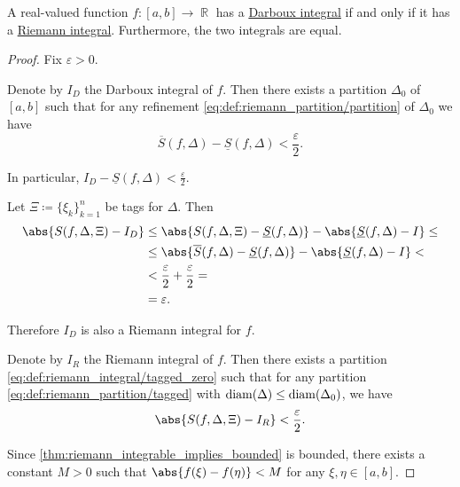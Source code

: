 \begin{proposition}\label{thm:darboux_integral_iff_riemann_integral}
  A real-valued function \( f: [a, b] \to \BbbR \) has a \hyperref[def:darboux_integral]{Darboux integral} if and only if it has a \hyperref[def:riemann_integral]{Riemann integral}. Furthermore, the two integrals are equal.
\end{proposition}
\begin{proof}
  Fix \( \varepsilon > 0 \).

   Denote by \( I_D \) the Darboux integral of \( f \). Then there exists a partition \( \Delta_0 \) of \( [a, b] \) such that for any refinement \eqref{eq:def:riemann_partition/partition} of \( \Delta_0 \) we have
  \begin{equation*}
    \overline{S}(f, \Delta) - \underline{S}(f, \Delta) < \frac \varepsilon 2.
  \end{equation*}

  In particular, \( I_D - \underline{S}(f, \Delta) < \tfrac \varepsilon 2 \).

  Let \( \Xi \coloneqq \{ \xi_k \}_{k=1}^n \) be tags for \( \Delta \). Then
  \begin{align*}
    \abs{S(f, \Delta, \Xi) - I_D}
    &\leq
    \abs{S(f, \Delta, \Xi) - \underline{S}(f, \Delta)} - \abs{\underline{S}(f, \Delta) - I}
    \leq \\ &\leq
    \abs{\overline{S}(f, \Delta) - \underline{S}(f, \Delta)} - \abs{\underline{S}(f, \Delta) - I}
    < \\ &<
    \frac \varepsilon 2 + \frac \varepsilon 2
    = \\ &=
    \varepsilon.
  \end{align*}

  Therefore \( I_D \) is also a Riemann integral for \( f \).

   Denote by \( I_R \) the Riemann integral of \( f \). Then there exists a partition \eqref{eq:def:riemann_integral/tagged_zero} such that for any partition \eqref{eq:def:riemann_partition/tagged} with \( \operatorname{diam}(\Delta) \leq \operatorname{diam}(\Delta_0) \), we have
  \begin{equation*}
    \abs{S(f, \Delta, \Xi) - I_R} < \frac \varepsilon 2.
  \end{equation*}

  Since \eqref{thm:riemann_integrable_implies_bounded} is bounded, there exists a constant \( M > 0 \) such that \( \abs{f(\xi) - f(\eta)} < M \) for any \( \xi, \eta \in [a, b] \).


\end{proof}
